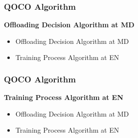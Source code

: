 \begin{frame}
	\frametitle{QOCO Algorithm}
	
	\textbf{Offloading Decision Algorithm at MD}
	

	\vspace{6mm}
	
	\begin{itemize}[]
		
		\item Offloading Decision Algorithm at MD
		
		
		\item Training Process Algorithm at EN
		
		
	\end{itemize}
	
	
\end{frame}

\begin{frame}
	\frametitle{QOCO Algorithm}
	
	\textbf{Training Process Algorithm at EN}
	
	
	\vspace{6mm}
	
	\begin{itemize}[]
		
		\item Offloading Decision Algorithm at MD
		
		
		\item Training Process Algorithm at EN
		
		
	\end{itemize}
	
	
\end{frame}